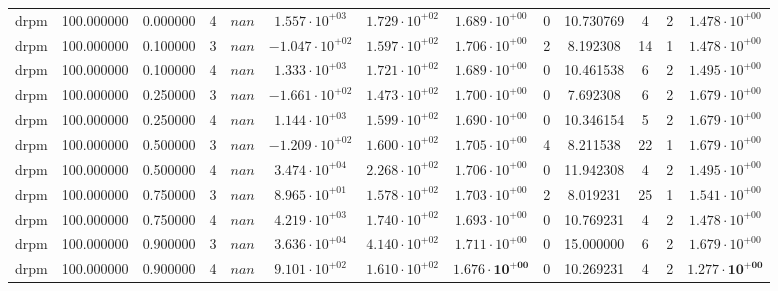 \begin{table}
\begin{tabular}{ccccccccccccc}
drpm & 100.000000 & 0.000000 & 4 & $nan$ & $1.557 \cdot 10^{+03}$ & $1.729 \cdot 10^{+02}$ & $1.689 \cdot 10^{+00}$ & 0 & 10.730769 & 4 & 2 & $1.478 \cdot 10^{+00}$ \\
drpm & 100.000000 & 0.100000 & 3 & $nan$ & $-1.047 \cdot 10^{+02}$ & $1.597 \cdot 10^{+02}$ & $1.706 \cdot 10^{+00}$ & 2 & 8.192308 & 14 & 1 & $1.478 \cdot 10^{+00}$ \\
drpm & 100.000000 & 0.100000 & 4 & $nan$ & $1.333 \cdot 10^{+03}$ & $1.721 \cdot 10^{+02}$ & $1.689 \cdot 10^{+00}$ & 0 & 10.461538 & 6 & 2 & $1.495 \cdot 10^{+00}$ \\
drpm & 100.000000 & 0.250000 & 3 & $nan$ & $-1.661 \cdot 10^{+02}$ & $1.473 \cdot 10^{+02}$ & $1.700 \cdot 10^{+00}$ & 0 & 7.692308 & 6 & 2 & $1.679 \cdot 10^{+00}$ \\
drpm & 100.000000 & 0.250000 & 4 & $nan$ & $1.144 \cdot 10^{+03}$ & $1.599 \cdot 10^{+02}$ & $1.690 \cdot 10^{+00}$ & 0 & 10.346154 & 5 & 2 & $1.679 \cdot 10^{+00}$ \\
drpm & 100.000000 & 0.500000 & 3 & $nan$ & $-1.209 \cdot 10^{+02}$ & $1.600 \cdot 10^{+02}$ & $1.705 \cdot 10^{+00}$ & 4 & 8.211538 & 22 & 1 & $1.679 \cdot 10^{+00}$ \\
drpm & 100.000000 & 0.500000 & 4 & $nan$ & $3.474 \cdot 10^{+04}$ & $2.268 \cdot 10^{+02}$ & $1.706 \cdot 10^{+00}$ & 0 & 11.942308 & 4 & 2 & $1.495 \cdot 10^{+00}$ \\
drpm & 100.000000 & 0.750000 & 3 & $nan$ & $8.965 \cdot 10^{+01}$ & $1.578 \cdot 10^{+02}$ & $1.703 \cdot 10^{+00}$ & 2 & 8.019231 & 25 & 1 & $1.541 \cdot 10^{+00}$ \\
drpm & 100.000000 & 0.750000 & 4 & $nan$ & $4.219 \cdot 10^{+03}$ & $1.740 \cdot 10^{+02}$ & $1.693 \cdot 10^{+00}$ & 0 & 10.769231 & 4 & 2 & $1.478 \cdot 10^{+00}$ \\
drpm & 100.000000 & 0.900000 & 3 & $nan$ & $3.636 \cdot 10^{+04}$ & $4.140 \cdot 10^{+02}$ & $1.711 \cdot 10^{+00}$ & 0 & 15.000000 & 6 & 2 & $1.679 \cdot 10^{+00}$ \\
drpm & 100.000000 & 0.900000 & 4 & $nan$ & $9.101 \cdot 10^{+02}$ & $1.610 \cdot 10^{+02}$ & $\mathbf{1.676 \cdot 10^{+00}}$ & 0 & 10.269231 & 4 & 2 & $\mathbf{1.277 \cdot 10^{+00}}$ \\
\bottomrule
\end{tabular}
\end{table}
